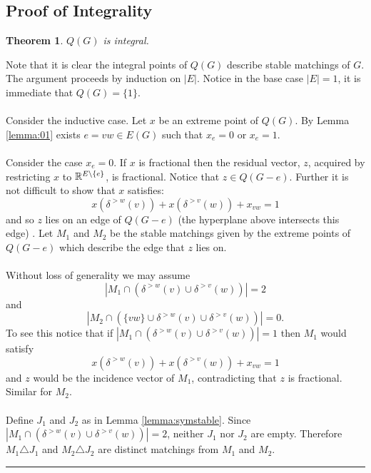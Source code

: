 \documentclass[preprint]{elsarticle}
\newtheorem{theorem}[fact]{Theorem}
\newenvironment{proof}{{\bf Proof:  }}{\hfill\rule{2mm}{2mm}}
\begin{document}
\subsection{Proof of Integrality}
\begin{theorem}
$Q(G)$ is integral.
\end{theorem}
\begin{proof}
Note that it is clear the integral points of $Q(G)$ describe stable matchings of $G$\cite{rothblum1992characterization}. The argument proceeds by induction on $|E|$. Notice in the base case $|E| = 1$, it is immediate that $Q(G) = \{1\}$.
\paragraph{}
Consider the inductive case. Let $x$ be an extreme point of $Q(G)$. By Lemma \ref{lemma:01} exists $e=vw \in E(G)$ such that $x_e = 0$ or $x_e = 1$. 
\paragraph{}
Consider the case $x_e = 0$. If $x$ is fractional then the residual vector, $z$, acquired by restricting $x$ to $\mathbb{R}^{E\backslash\{e\}}$, is fractional. Notice that $z \in Q(G-e)$. Further it is not difficult to show that $x$ satisfies:
$$x(\delta^{>w}(v))+ x(\delta^{>v}(w)) + x_{vw} = 1$$
and so $z$ lies on an edge of $Q(G-e)$ (the hyperplane above intersects this edge) . Let $M_1$ and $M_2$ be the stable matchings given by the extreme points of $Q(G-e)$ which describe the edge that $z$ lies on.
\paragraph{}
Without loss of generality we may assume
$$ |M_1 \cap(\delta^{>w}(v) \cup \delta^{>v}(w))| = 2 $$
and 
$$ |M_2 \cap(\{vw\} \cup \delta^{>w}(v) \cup \delta^{>v}(w))| = 0.$$
To see this notice that if $|M_1 \cap(\delta^{>w}(v) \cup \delta^{>v}(w))| = 1$ then $M_1$ would satisfy $$x(\delta^{>w}(v))+ x(\delta^{>v}(w)) + x_{vw} = 1$$ and $z$ would be the incidence vector of $M_1$, contradicting that $z$ is fractional. Similar for $M_2$.
\paragraph{}
Define $J_1$ and $J_2$ as in Lemma \ref{lemma:symstable}. Since $|M_1 \cap(\delta^{>w}(v) \cup \delta^{>v}(w))| = 2$, neither $J_1$ nor $J_2$ are empty. Therefore $M_1 \triangle J_1$ and $M_2 \triangle J_2$ are distinct matchings from $M_1$ and $M_2$.

\end{proof}
\end{document}
